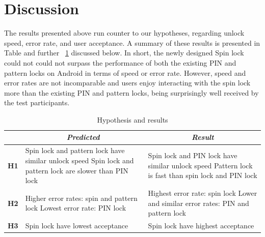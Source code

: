 \documentclass{sigchi}
\begin{document}
\section{Discussion}
The results presented above run counter to our hypotheses, regarding unlock speed, error rate, and user acceptance. A summary of these results is presented in Table  and further ~\ref{tab:hypothesis_result} discussed below. In short, the newly designed Spin lock could not could not surpass the performance of both the existing PIN and pattern locks on Android in terms of speed or error rate. However, speed and error rates are not incomparable and users enjoy interacting with the spin lock more than the existing PIN and pattern locks, being surprisingly well received by the test participants.

\begin{table}[h]
\centering
\small
  \begin{tabularx}{\columnwidth}{c  X  X}
    \toprule
     & \multicolumn{1}{c}{\small\textit{ Predicted}}  & \multicolumn{1}{c}{\small\textit{ Result}}\\
    \midrule
    \small\textbf{H1} & Spin lock and pattern lock have similar unlock speed  \newline
    								      Spin lock and pattern lock are slower than PIN lock  & 				  
    								      Spin lock and PIN lock have similar unlock speed \newline
    								      Pattern lock is fast than spin lock and PIN lock \\
    \midrule
    \small\textbf{H2} & Higher error rates: spin and pattern lock  \newline
    								      Lowest error rate: PIN lock & 
				 						Highest error rate: spin lock\newline
    								      Lower and similar error rates: PIN and pattern lock\\    \midrule
    \small\textbf{H3} &Spin lock have lowest acceptance  
    			       & Spin lock have highest acceptance\\ 
    \bottomrule
  \end{tabularx}
  \caption{Hypothesis and results}~\label{tab:hypothesis_result}
\end{table}
\end{document}
